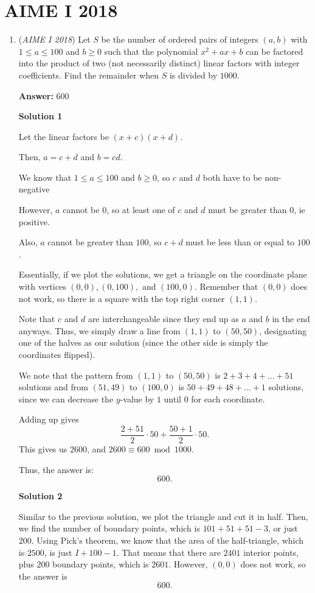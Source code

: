 \section{AIME I 2018}
        \begin{enumerate}
        	\item (\textit{AIME I 2018}) Let $S$ be the number of ordered pairs of integers $(a,b)$ with $1 \leq a \leq 100$ and $b \geq 0$ such that the polynomial $x^2+ax+b$ can be factored into the product of two (not necessarily distinct) linear factors with integer coefficients. Find the remainder when $S$ is divided by $1000$.


 
 \textbf{Answer: }600



\textbf{Solution 1}

Let the linear factors be $(x+c)(x+d)$.

 Then, $a=c+d$ and $b=cd$.

 We know that $1\le a\le 100$ and $b\ge 0$, so $c$ and $d$ both have to be non-negative

 However, $a$ cannot be $0$, so at least one of $c$ and $d$ must be greater than $0$, ie positive.

 Also, $a$ cannot be greater than $100$, so $c+d$ must be less than or equal to $100$.

 Essentially, if we plot the solutions, we get a triangle on the coordinate plane with vertices $(0,0), (0, 100),$ and $(100,0)$. Remember that $(0,0)$ does not work, so there is a square with the top right corner $(1,1)$.

 Note that $c$ and $d$ are interchangeable since they end up as $a$ and $b$ in the end anyways. Thus, we simply draw a line from $(1,1)$ to $(50,50)$, designating one of the halves as our solution (since the other side is simply the coordinates flipped).

 We note that the pattern from $(1,1)$ to $(50,50)$ is $2+3+4+\dots+51$ solutions and from $(51, 49)$ to $(100,0)$ is $50+49+48+\dots+1$ solutions, since we can decrease the $y$-value by $1$ until $0$ for each coordinate.

 Adding up gives 
 \[\dfrac{2+51}{2}\cdot 50+\dfrac{50+1}{2}\cdot 50.\]This gives us $2600$, and $2600\equiv 600 \bmod{1000}.$

 Thus, the answer is: 
 \[\boxed{600}.\]




\textbf{Solution 2}

Similar to the previous solution, we plot the triangle and cut it in half. Then, we find the number of boundary points, which is $101+51+51-3$, or just $200$. Using Pick's theorem, we know that the area of the half-triangle, which is $2500$, is just $I+100-1$. That means that there are $2401$ interior points, plus $200$ boundary points, which is $2601$. However, $(0,0)$ does not work, so the answer is 
 \[\boxed{600}.\]





\end{enumerate}
